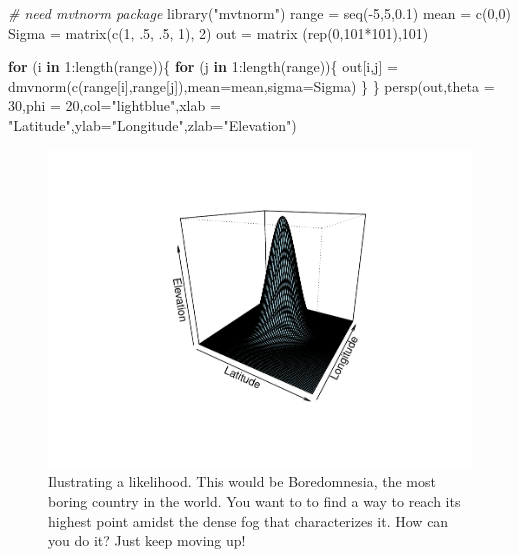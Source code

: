 \documentclass[
]{book}
\newenvironment{Shaded}{\begin{snugshade}}{\end{snugshade}}
\newcommand{\AttributeTok}[1]{\textcolor[rgb]{0.77,0.63,0.00}{#1}}
\newcommand{\CommentTok}[1]{\textcolor[rgb]{0.56,0.35,0.01}{\textit{#1}}}
\newcommand{\ControlFlowTok}[1]{\textcolor[rgb]{0.13,0.29,0.53}{\textbf{#1}}}
\newcommand{\DecValTok}[1]{\textcolor[rgb]{0.00,0.00,0.81}{#1}}
\newcommand{\FloatTok}[1]{\textcolor[rgb]{0.00,0.00,0.81}{#1}}
\newcommand{\FunctionTok}[1]{\textcolor[rgb]{0.00,0.00,0.00}{#1}}
\newcommand{\NormalTok}[1]{#1}
\newcommand{\OtherTok}[1]{\textcolor[rgb]{0.56,0.35,0.01}{#1}}
\newcommand{\SpecialCharTok}[1]{\textcolor[rgb]{0.00,0.00,0.00}{#1}}
\newcommand{\StringTok}[1]{\textcolor[rgb]{0.31,0.60,0.02}{#1}}
\begin{document}
\begin{Shaded}
\begin{Highlighting}[]
\CommentTok{\# need mvtnorm package}
\FunctionTok{library}\NormalTok{(}\StringTok{"mvtnorm"}\NormalTok{)}
\NormalTok{range }\OtherTok{=} \FunctionTok{seq}\NormalTok{(}\SpecialCharTok{{-}}\DecValTok{5}\NormalTok{,}\DecValTok{5}\NormalTok{,}\FloatTok{0.1}\NormalTok{)}
\NormalTok{mean }\OtherTok{=} \FunctionTok{c}\NormalTok{(}\DecValTok{0}\NormalTok{,}\DecValTok{0}\NormalTok{)}
\NormalTok{Sigma }\OtherTok{=} \FunctionTok{matrix}\NormalTok{(}\FunctionTok{c}\NormalTok{(}\DecValTok{1}\NormalTok{, .}\DecValTok{5}\NormalTok{, .}\DecValTok{5}\NormalTok{, }\DecValTok{1}\NormalTok{), }\DecValTok{2}\NormalTok{)}
\NormalTok{out }\OtherTok{=} \FunctionTok{matrix}\NormalTok{ (}\FunctionTok{rep}\NormalTok{(}\DecValTok{0}\NormalTok{,}\DecValTok{101}\SpecialCharTok{*}\DecValTok{101}\NormalTok{),}\DecValTok{101}\NormalTok{)}

\ControlFlowTok{for}\NormalTok{ (i }\ControlFlowTok{in} \DecValTok{1}\SpecialCharTok{:}\FunctionTok{length}\NormalTok{(range))\{}
    \ControlFlowTok{for}\NormalTok{ (j }\ControlFlowTok{in} \DecValTok{1}\SpecialCharTok{:}\FunctionTok{length}\NormalTok{(range))\{}
\NormalTok{        out[i,j] }\OtherTok{=} \FunctionTok{dmvnorm}\NormalTok{(}\FunctionTok{c}\NormalTok{(range[i],range[j]),}\AttributeTok{mean=}\NormalTok{mean,}\AttributeTok{sigma=}\NormalTok{Sigma)}
\NormalTok{    \}}
\NormalTok{\}}
 \FunctionTok{persp}\NormalTok{(out,}\AttributeTok{theta =} \DecValTok{30}\NormalTok{,}\AttributeTok{phi =} \DecValTok{20}\NormalTok{,}\AttributeTok{col=}\StringTok{"lightblue"}\NormalTok{,}\AttributeTok{xlab =} \StringTok{"Latitude"}\NormalTok{,}\AttributeTok{ylab=}\StringTok{"Longitude"}\NormalTok{,}\AttributeTok{zlab=}\StringTok{"Elevation"}\NormalTok{)}
\end{Highlighting}
\end{Shaded}

\begin{figure}

{\centering \includegraphics[width=0.8\linewidth]{ECOMODbook_files/figure-latex/country-1} 

}

\caption{Ilustrating a likelihood. This would be Boredomnesia, the most boring country in the world. You want to to find a way to reach its highest point amidst the dense fog that characterizes it. How can you do it? Just keep moving up!}\label{fig:country}
\end{figure}
\end{document}
